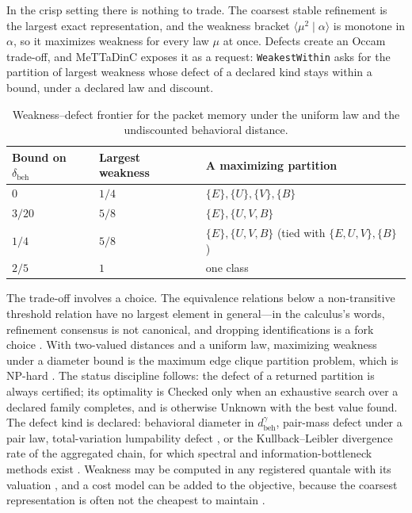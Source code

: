\documentclass[11pt]{article}
\newcommand{\code}[1]{\texttt{#1}}
\newcommand{\br}[2]{\langle #1 \mid #2 \rangle}
\newcommand{\dbd}{\delta_{\mathrm{beh}}}
\newcommand{\dbeh}{d_{\mathrm{beh}}}
\theoremstyle{definition}
\theoremstyle{plain}
\begin{document}
In the crisp setting there is nothing to trade. The coarsest stable refinement is the largest
exact representation, and the weakness bracket $\br{\mu^2}{\alpha}$ is monotone in $\alpha$, so
it maximizes weakness for every law $\mu$ at once. Defects create an Occam trade-off,
and MeTTaDinC exposes it as a request: \code{WeakestWithin} asks for the partition of largest
weakness whose defect of a declared kind stays within a bound, under a declared law and discount.

\begin{table}[ht]
\centering\small
\begin{tabular}{lll}
\toprule
Bound on $\dbd$ & Largest weakness & A maximizing partition\\
\midrule
$0$ & $1/4$ & $\{E\},\{U\},\{V\},\{B\}$\\
$3/20$ & $5/8$ & $\{E\},\{U,V,B\}$\\
$1/4$ & $5/8$ & $\{E\},\{U,V,B\}$ (tied with $\{E,U,V\},\{B\}$)\\
$2/5$ & $1$ & one class\\
\bottomrule
\end{tabular}
\caption{Weakness--defect frontier for the packet memory under the uniform law and the
undiscounted behavioral distance.}\label{tab:frontier}
\end{table}

The trade-off involves a choice. The equivalence relations below a non-transitive threshold
relation have no largest element in general---in the calculus's words, refinement consensus is
not canonical, and dropping identifications is a fork choice \cite{dclosure}. With two-valued
distances and a uniform law, maximizing weakness under a diameter bound is the maximum edge clique
partition problem, which is NP-hard \cite{maxecp}. The status discipline follows: the defect of a
returned partition is always certified; its optimality is Checked only when an exhaustive search
over a declared family completes, and is otherwise Unknown with the best value found. The defect
kind is declared: behavioral diameter in $\dbeh^\gamma$, pair-mass defect under a pair law,
total-variation lumpability defect \cite{franceschinis,buchholz}, or the Kullback--Leibler
divergence rate of the aggregated chain, for which spectral and information-bottleneck methods
exist \cite{dmm,geiger}. Weakness may be computed in any registered quantale with its valuation
\cite{quantale}, and a cost model can be added to the objective, because the coarsest
representation is often not the cheapest to maintain \cite{codd}.
\end{document}
